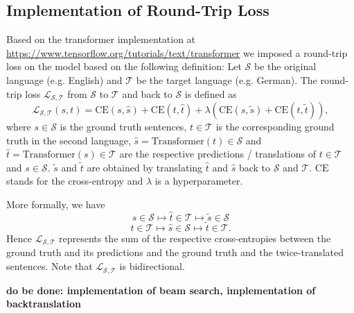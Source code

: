 \documentclass[11pt,a4paper]{article}
\begin{document}
\subsection{Implementation of Round-Trip Loss}
Based on the transformer implementation at \href{https://www.tensorflow.org/tutorials/text/transformer}{https://www.tensorflow.org/tutorials/text/transformer} we imposed a round-trip loss on the model based on the following definition: Let $\mathcal{S}$ be the original language (e.g. English) and $\mathcal{T}$ be the target language (e.g. German). The round-trip loss $\mathcal{L}_{\mathcal{S}, \mathcal{T}}$ from $\mathcal{S}$ to $\mathcal{T}$ and back to $\mathcal{S}$ is defined as
\begin{equation}
    \mathcal{L}_{\mathcal{S}, \mathcal{T}} (s,t) = \text{CE}(s, \hat{s}) + \text{CE}(t, \hat{t}) + \lambda \left(\text{CE}(s, \tilde{s}) + \text{CE}(t, \tilde{t})\right),
\end{equation}
where $s \in \mathcal{S}$ is the ground truth sentences, $t \in \mathcal{T}$ is the corresponding ground truth in the second language, $\hat{s} = \text{Transformer}(t) \in \mathcal{S}$ and $\hat{t} = \text{Transformer}(s) \in \mathcal{T}$ are the respective predictions / translations of $t \in \mathcal{T}$ and $s \in \mathcal{S}$. $\tilde{s}$ and $\tilde{t}$ are obtained by translating $\hat{t}$ and $\hat{s}$ back to $\mathcal{S}$ and $\mathcal{T}$. $\text{CE}$ stands for the cross-entropy and $\lambda$ is a hyperparameter. 

More formally, we have
\begin{equation}
    s \in \mathcal{S} \longmapsto{} \hat{t} \in \mathcal{T} \longmapsto{} \tilde{s} \in \mathcal{S}
\end{equation}
\begin{equation}
    t \in \mathcal{T} \longmapsto{} \hat{s} \in \mathcal{S} \longmapsto{} \tilde{t} \in \mathcal{T}.
\end{equation}
Hence $\mathcal{L}_{\mathcal{S}, \mathcal{T}}$ represents the sum of the respective cross-entropies between the ground truth and its predictions and the ground truth and the twice-translated sentences. Note that $\mathcal{L}_{\mathcal{S}, \mathcal{T}}$ is bidirectional.

\textbf{do be done: implementation of beam search, implementation of backtranslation}
\end{document}

